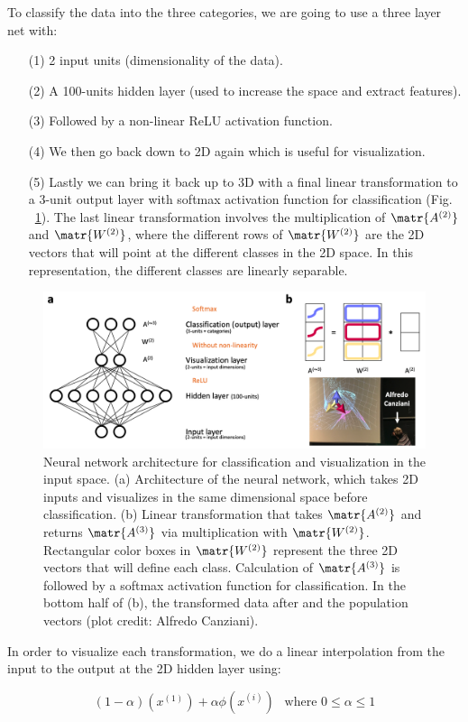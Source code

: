 \noindent
To classify the data into the three categories, we are going to use a three layer net with: 
\begin{itemize}
\item[(1)] 2 input units (dimensionality of the data).
\item[(2)] A 100-units hidden layer (used to increase the space and extract features).
\item[(3)] Followed by a non-linear ReLU activation function. 
\item[(4)] We then go back down to 2D again which is useful for visualization.
\item[(5)] Lastly we can bring it back up to 3D with a final linear transformation to a 3-unit output layer with softmax activation function for classification 
(Fig. ~\ref{fig:ArchitectureForClassificationAndVisualizationInTheInputSpace}). 
The last linear transformation involves the multiplication of $\matr{A^{(2)}}$ and $\matr{W^{(2)}}$, 
where the different rows of $\matr{W^{(2)}}$ are the 2D vectors that will point at the different classes in the 2D space. 
In this representation, the different classes are linearly separable.
\end{itemize}

\begin{figure}[!h]
\centering
\includegraphics[width=170mm]{figs/ArchitectureForClassificationAndVisualizationInTheInputSpace.png}
\caption{Neural network architecture for classification and visualization in the input space. (a) Architecture of the neural network, which takes 2D inputs and visualizes in the same dimensional space before classification. (b) Linear transformation that takes $\matr{A^{(2)}}$ and returns $\matr{A^{(3)}}$ via multiplication with $\matr{W^{(2)}}$. Rectangular color boxes in $\matr{W^{(2)}}$ represent the three 2D vectors that will define each class. Calculation of $\matr{A^{(3)}}$ is followed by a softmax activation function for classification. In the bottom half of (b), the transformed data after and the population vectors (plot credit: Alfredo Canziani).}
\label{fig:ArchitectureForClassificationAndVisualizationInTheInputSpace}
\end{figure}

\noindent

In order to visualize each transformation, we do a linear interpolation from the input to the output at the 2D hidden layer using:

\[
(1-\alpha)(x^{(1)}) + \alpha \phi (x^{(i)}) ~~\text{ where } 0 \leq \alpha \leq 1
\]
